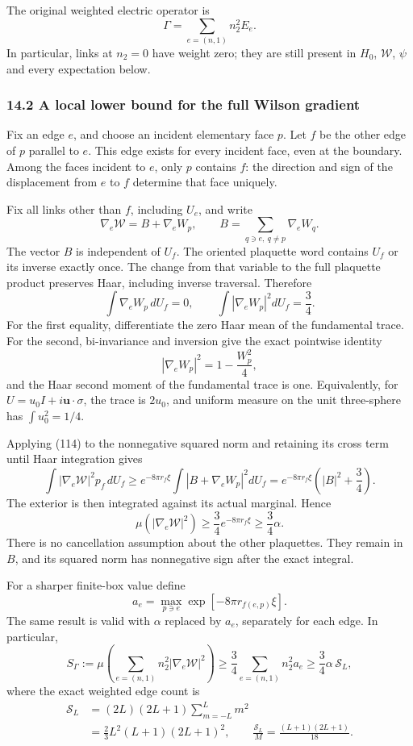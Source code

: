 \documentclass[
  11pt,
]{article}
\begin{document}
The original weighted electric operator is \[
 \Gamma=\sum_{e=(n,1)}n_2^2E_e.
 \tag{116}
\] In particular, links at \(n_2=0\) have weight zero; they are still
present in \(H_0\), \(\mathcal W\), \(\psi\) and every expectation
below.

\subsubsection{14.2 A local lower bound for the full Wilson
gradient}\label{a-local-lower-bound-for-the-full-wilson-gradient}

Fix an edge \(e\), and choose an incident elementary face \(p\). Let
\(f\) be the other edge of \(p\) parallel to \(e\). This edge exists for
every incident face, even at the boundary. Among the faces incident to
\(e\), only \(p\) contains \(f\): the direction and sign of the
displacement from \(e\) to \(f\) determine that face uniquely.

Fix all links other than \(f\), including \(U_e\), and write \[
 \nabla_e\mathcal W=B+\nabla_eW_p,
 \qquad B=\sum_{q\ni e,\ q\ne p}\nabla_eW_q.
\] The vector \(B\) is independent of \(U_f\). The oriented plaquette
word contains \(U_f\) or its inverse exactly once. The change from that
variable to the full plaquette product preserves Haar, including inverse
traversal. Therefore \[
 \int \nabla_eW_p\,dU_f=0,\qquad
 \int |\nabla_eW_p|^2dU_f=\frac34.
 \tag{117}
\] For the first equality, differentiate the zero Haar mean of the
fundamental trace. For the second, bi-invariance and inversion give the
exact pointwise identity \[
 |\nabla_eW_p|^2=1-\frac{W_p^2}{4},
\] and the Haar second moment of the fundamental trace is one.
Equivalently, for \(U=u_0I+i\mathbf u\cdot\sigma\), the trace is
\(2u_0\), and uniform measure on the unit three-sphere has
\(\int u_0^2=1/4\).

Applying (114) to the nonnegative squared norm and retaining its cross
term until Haar integration gives \[
 \int |\nabla_e\mathcal W|^2 p_f\,dU_f
 \ge e^{-8\pi r_f\xi}
       \int|B+\nabla_eW_p|^2dU_f
 =e^{-8\pi r_f\xi}\left(|B|^2+\frac34\right).
\] The exterior is then integrated against its actual marginal. Hence \[
 \mu(|\nabla_e\mathcal W|^2)
 \ge\frac34 e^{-8\pi r_f\xi}\ge\frac34\alpha.
 \tag{118}
\] There is no cancellation assumption about the other plaquettes. They
remain in \(B\), and its squared norm has nonnegative sign after the
exact integral.

For a sharper finite-box value define \[
 a_e=\max_{p\ni e}\exp[-8\pi r_{f(e,p)}\xi].
\] The same result is valid with \(\alpha\) replaced by \(a_e\),
separately for each edge. In particular, \[
 S_\Gamma:=\mu\!\left(\sum_{e=(n,1)}n_2^2
                     |\nabla_e\mathcal W|^2\right)
 \ge\frac34\sum_{e=(n,1)}n_2^2a_e
 \ge\frac34\alpha\,\mathscr S_L,
 \tag{119}
\] where the exact weighted edge count is \[
 \begin{split}
 \mathscr S_L
 &= (2L)(2L+1)\sum_{m=-L}^Lm^2\\
 &=\frac23L^2(L+1)(2L+1)^2,\qquad
 \frac{\mathscr S_L}{M}=\frac{(L+1)(2L+1)}{18}.
 \end{split}
 \tag{120}
\]
\end{document}
